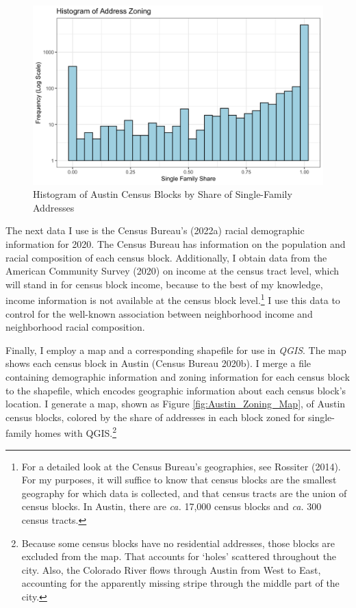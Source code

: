 \documentclass[11pt]{article}
\begin{document}
\begin{figure}
    \centering
    \includegraphics[width=\textwidth]{By_Block_Histogram.pdf}
    \caption{Histogram of Austin Census Blocks by Share of Single-Family Addresses}
    \label{fig:address_histogram}
\end{figure}

The next data I use is the Census Bureau’s (2022a) racial demographic information for 2020. The Census Bureau has information on the population and racial composition of each census block. Additionally, I obtain data from the American Community Survey (2020) on income at the census tract level, which will stand in for census block income, because to the best of my knowledge, income information is not available at the census block level.\footnote{For a detailed look at the Census Bureau’s geographies, see Rossiter (2014). For my purposes, it will suffice to know that census blocks are the smallest geography for which data is collected, and that census tracts are the union of census blocks. In Austin, there are \textit{ca.} 17,000 census blocks and \textit{ca.} 300 census tracts.} I use this data to control for the well-known association between neighborhood income and neighborhood racial composition.

Finally, I employ a map and a corresponding shapefile for use in \textit{QGIS}. The map shows each census block in Austin (Census Bureau 2020b). I merge a file containing demographic information and zoning information for each census block to the shapefile, which encodes geographic information about each census block's location. I generate a map, shown as Figure \ref{fig:Austin_Zoning_Map}, of Austin census blocks, colored by the share of addresses in each block zoned for single-family homes with QGIS.\footnote{Because some census blocks have no residential addresses, those blocks are excluded from the map. That accounts for `holes' scattered throughout the city. Also, the Colorado River flows through Austin from West to East, accounting for the apparently missing stripe through the middle part of the city.}
\end{document}
